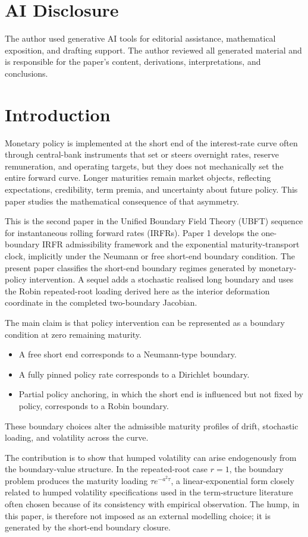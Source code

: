 \documentclass[11pt]{article}
\numberwithin{equation}{section}
\begin{document}
\section*{AI Disclosure}
The author used generative AI tools for editorial assistance, mathematical exposition, and drafting support. The author reviewed all generated material and is responsible for the paper's content, derivations, interpretations, and conclusions.

\section{Introduction}

Monetary policy is implemented at the short end of the interest-rate curve often through central-bank instruments that set or steers overnight rates, reserve remuneration, and operating targets, but they does not mechanically set the entire forward curve. Longer maturities remain market objects, reflecting expectations, credibility, term premia, and uncertainty about future policy. This paper studies the mathematical consequence of that asymmetry.

This is the second paper in the Unified Boundary Field Theory (UBFT) sequence for instantaneous rolling forward rates (IRFRs). Paper 1 develops the one-boundary IRFR admissibility framework and the exponential maturity-transport clock, implicitly under the Neumann or free short-end boundary condition. The present paper classifies the short-end boundary regimes generated by monetary-policy intervention. A sequel adds a stochastic realised long boundary and uses the Robin repeated-root loading derived here as the interior deformation coordinate in the completed two-boundary Jacobian.

The main claim is that policy intervention can be represented as a boundary condition at zero remaining maturity. 
\begin{itemize} 
\item A free short end corresponds to a Neumann-type boundary. 
\item A fully pinned policy rate corresponds to a Dirichlet boundary. 
\item Partial policy anchoring, in which the short end is influenced but not fixed by policy, corresponds to a Robin boundary. 
\end{itemize}
These boundary choices alter the admissible maturity profiles of drift, stochastic loading, and volatility across the curve.

The contribution is to show that humped volatility can arise endogenously from the boundary-value structure. In the repeated-root case $r=1$, the boundary problem produces the maturity loading $\tau e^{-a^2\tau}$, a linear-exponential form closely related to humped volatility specifications used in the term-structure literature often chosen because of its consistency with empirical observation. The hump, in this paper, is therefore not imposed as an external modelling choice; it is generated by the short-end boundary closure.
\end{document}
